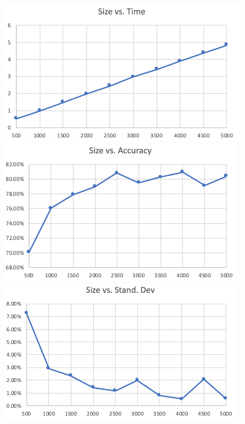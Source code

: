 \documentclass[12pt]{article}
\begin{document}
    \bigbreak
    \includegraphics[height=6cm]{perc_time_digit}
    \bigbreak
    \includegraphics[height=6cm]{perc_acc_digit}
    \bigbreak
    \includegraphics[height=6cm]{perc_std_digit}
\end{document}
